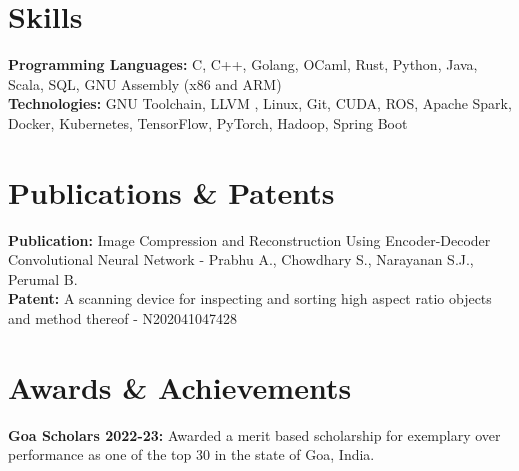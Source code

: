 \documentclass[12pt]{article}
\newcommand{\resumeSubHeadingListStart}{\begin{itemize}[leftmargin=0.15in, label={}]}
\newcommand{\resumeSubHeadingListEnd}{\end{itemize}}
\begin{document}

\section{Skills}
  \resumeSubHeadingListStart
    \small{\item{
        \textbf{Programming Languages: }{C, C++, Golang, OCaml, Rust, Python, Java, Scala, SQL, GNU Assembly (x86 and ARM)} \\
        \textbf{Technologies: }{GNU Toolchain, LLVM ,  Linux, Git, CUDA, ROS, Apache Spark, Docker, Kubernetes, TensorFlow, PyTorch, Hadoop, Spring Boot} \\
      }}
  \resumeSubHeadingListEnd


  \section{Publications \& Patents}
  \resumeSubHeadingListStart
    \small{\item{
        \textbf{Publication:}{ Image Compression and Reconstruction Using Encoder-Decoder Convolutional Neural Network - Prabhu A., Chowdhary S., Narayanan S.J., Perumal B.} \\ 
        \textbf{Patent:}{ A scanning device for inspecting and sorting high aspect ratio objects and method thereof - N202041047428} 
      }}
  \resumeSubHeadingListEnd


\section{Awards \& Achievements}
  \resumeSubHeadingListStart
    \small{\item{
        \textbf{Goa Scholars 2022-23:}{ Awarded a merit based scholarship for exemplary over performance as one of the top 30 in the state of Goa, India.} \\ 
        }}
  \resumeSubHeadingListEnd




    
\end{document}
